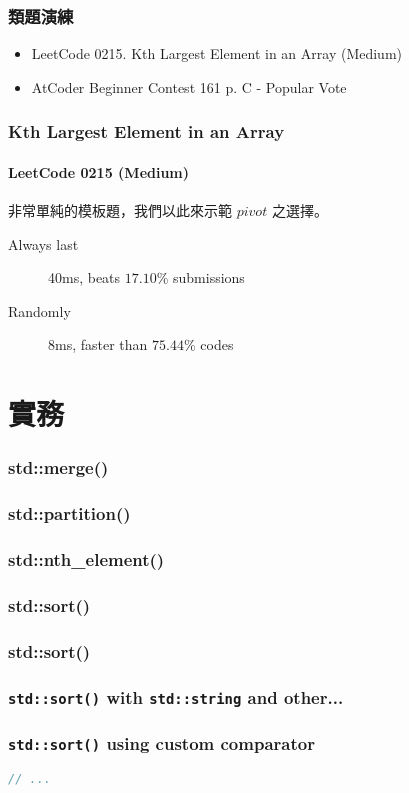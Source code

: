\documentclass{beamer}
\begin{document}
\frame
{
	\frametitle{類題演練}
	
	\begin{itemize}
		\item LeetCode 0215. Kth Largest Element in an Array (Medium)
		\item AtCoder Beginner Contest 161 p. C - Popular Vote
	\end{itemize}
}

\frame
{
	\frametitle{Kth Largest Element in an Array}
	\framesubtitle{LeetCode 0215 (Medium)}
	
	非常單純的模板題，我們以此來示範 $pivot$ 之選擇。
	
	\begin{description}
		\item[Always last] 40ms, beats $17.10\%$ submissions
		\item[Randomly] 8ms, faster than $75.44\%$ codes
	\end{description}
}

\section{實務}

\frame
{
	\frametitle{\ttfamily std::merge()}
	
	\small
	
}

\frame
{
	\frametitle{\ttfamily std::partition()}
	
	\small
	
}

\frame
{
	\frametitle{\ttfamily std::nth\_element()}
	
	
}

\subsubsection{std::sort()}

\frame
{
	\frametitle{\ttfamily std::sort()}
	
	
}

\frame
{
	\frametitle{\texttt{std::sort()} with \texttt{std::string} and other...}
	
	
}

\begin{frame}[fragile]
	\frametitle{\texttt{std::sort()} using custom comparator}
	
	\small
	
	\begin{lstlisting}[language=C++]
// ...
    \end{lstlisting}
	
\end{frame}
\end{document}
